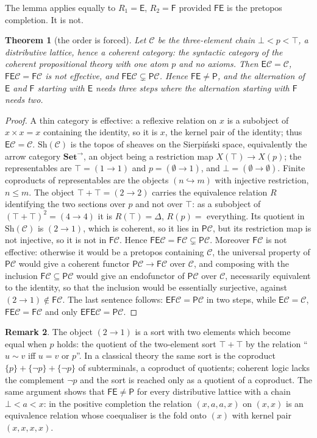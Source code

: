 \documentclass[11pt]{amsart}
\newtheorem{thm}{Theorem}[section]
\theoremstyle{definition}
\newtheorem{rem}[thm]{Remark}
\newcommand{\Sh}{\mathrm{Sh}}
\newcommand{\Set}{\mathbf{Set}}
\newcommand{\FF}{\mathsf F}
\newcommand{\EE}{\mathsf E}
\newcommand{\PP}{\mathsf P}
\newcommand{\cC}{\mathcal C}
\begin{document}
The lemma applies equally to $R_1=\EE$, $R_2=\FF$ provided $\FF\EE$ is
the pretopos completion. It is not.

\begin{thm}[the order is forced]\label{thm:order}
Let $\cC$ be the three-element chain $\bot<p<\top$, a distributive
lattice, hence a coherent category: the syntactic category of the
coherent propositional theory with one atom $p$ and no axioms. Then
$\EE\cC=\cC$, $\FF\EE\cC=\FF\cC$ is not effective, and $\FF\EE\cC\subsetneq
\PP\cC$. Hence $\FF\EE\ne\PP$, and the alternation of $\EE$ and $\FF$
starting with $\EE$ needs three steps where the alternation starting
with $\FF$ needs two.
\end{thm}
\begin{proof}
A thin category is effective: a reflexive relation on $x$ is a
subobject of $x\times x=x$ containing the identity, so it is $x$, the
kernel pair of the identity; thus $\EE\cC=\cC$. $\Sh(\cC)$ is the topos
of sheaves on the Sierpi\'nski space, equivalently the arrow category
$\Set^{\to}$, an object being a restriction map $X(\top)\to X(p)$; the
representables are $\top=(1\to1)$ and $p=(\emptyset\to1)$, and
$\bot=(\emptyset\to\emptyset)$. Finite coproducts of representables are
the objects $(n\hookrightarrow m)$ with injective restriction, $n\le m$.
The object $\top+\top=(2\to2)$ carries the equivalence relation $R$
identifying the two sections over $p$ and not over $\top$: as a subobject
of $(\top+\top)^2=(4\to4)$ it is $R(\top)=\Delta$, $R(p)=$ everything.
Its quotient in $\Sh(\cC)$ is $(2\to1)$, which is coherent, so it lies
in $\PP\cC$, but its restriction map is not injective, so it is not in
$\FF\cC$. Hence $\FF\EE\cC=\FF\cC\subsetneq\PP\cC$. Moreover $\FF\cC$ is
not effective: otherwise it would be a pretopos containing $\cC$, the
universal property of $\PP\cC$ would give a coherent functor $\PP\cC\to
\FF\cC$ over $\cC$, and composing with the inclusion $\FF\cC\subseteq
\PP\cC$ would give an endofunctor of $\PP\cC$ over $\cC$, necessarily
equivalent to the identity, so that the inclusion would be essentially
surjective, against $(2\to1)\notin\FF\cC$. The last sentence follows: $\EE\FF\cC=\PP\cC$ in two
steps, while $\EE\cC=\cC$, $\FF\EE\cC=\FF\cC$ and only $\EE\FF\EE\cC=\PP\cC$.
\end{proof}

\begin{rem}
The object $(2\to1)$ is a sort with two elements which become equal
when $p$ holds: the quotient of the two-element sort $\top+\top$ by the
relation ``$u\sim v$ iff $u=v$ or $p$''. In a classical theory the same
sort is the coproduct $\{p\}+\{\neg p\}+\{\neg p\}$ of subterminals, a
coproduct of quotients; coherent logic lacks the complement $\neg p$ and
the sort is reached only as a quotient of a coproduct. The same argument
shows that $\FF\EE\ne\PP$ for every distributive lattice with a chain
$\bot<a<x$: in the positive completion the relation $(x,a,a,x)$ on
$(x,x)$ is an equivalence relation whose coequaliser is the fold onto
$(x)$ with kernel pair $(x,x,x,x)$.
\end{rem}
\end{document}
